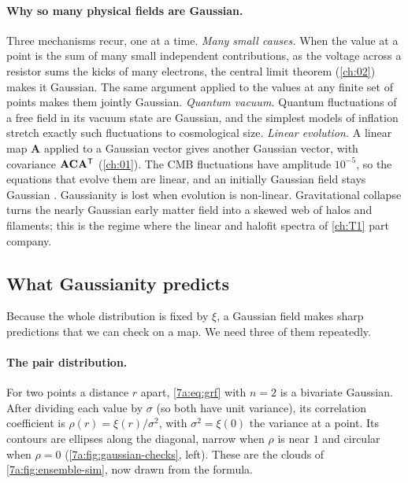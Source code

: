 \paragraph{Why so many physical fields are Gaussian.}
Three mechanisms recur, one at a time.
\emph{Many small causes.} When the value at a point is the sum of many small
independent contributions, as the voltage across a resistor sums the kicks of
many electrons, the central limit theorem (\cref{ch:02}) makes it Gaussian. The
same argument applied to the values at any finite set of points makes them
jointly Gaussian.
\emph{Quantum vacuum.} Quantum fluctuations of a free field in its vacuum state
are Gaussian, and the simplest models of inflation stretch exactly such
fluctuations to cosmological size.
\emph{Linear evolution.} A linear map $\mathbf A$ applied to a Gaussian vector
gives another Gaussian vector, with covariance $\mathbf A\mathbf{C}\mathbf A^{\mathsf{T}}$
(\cref{ch:01}). The CMB fluctuations have amplitude $10^{-5}$, so the equations
that evolve them are linear, and an initially Gaussian field stays Gaussian
.
Gaussianity is lost when evolution is non-linear. Gravitational collapse turns
the nearly Gaussian early matter field into a skewed web of halos and filaments;
this is the regime where the linear and halofit spectra of \cref{ch:T1} part
company.

\subsection{What Gaussianity predicts}
\label{7a:sec:grf-predicts}

Because the whole distribution is fixed by $\xi$, a Gaussian field makes sharp
predictions that we can check on a map. We need three of them repeatedly.

\paragraph{The pair distribution.}
For two points a distance $r$ apart, \eqref{7a:eq:grf} with $n=2$ is a
bivariate Gaussian. After dividing each value by $\sigma$ (so both have unit
variance), its correlation coefficient is $\rho(r)=\xi(r)/\sigma^2$, with
$\sigma^2=\xi(0)$ the variance at a point. Its contours are ellipses along the diagonal, narrow
when $\rho$ is near $1$ and circular when $\rho=0$
(\cref{7a:fig:gaussian-checks}, left). These are the clouds of
\cref{7a:fig:ensemble-sim}, now drawn from the formula.

